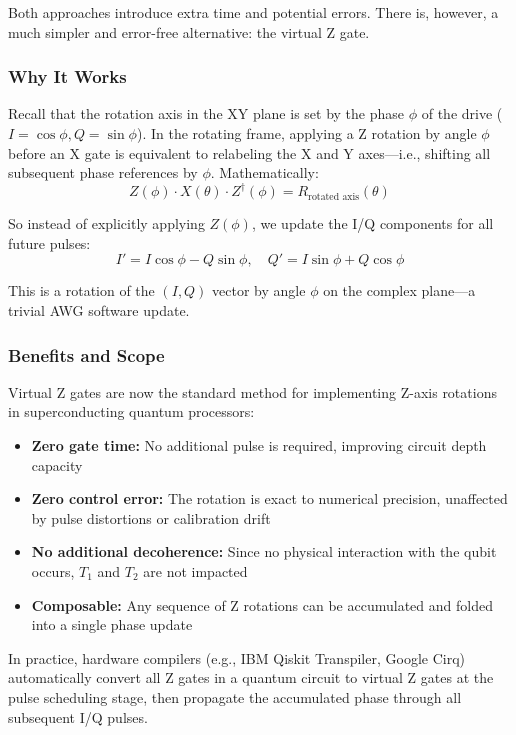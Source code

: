 \documentclass{article}
\begin{document}
Both approaches introduce extra time and potential errors. There is, however, a much simpler and error-free alternative: the virtual Z gate.

\subsubsection*{Why It Works}

Recall that the rotation axis in the XY plane is set by the phase $\phi$ of the drive ($I = \cos\phi, Q = \sin\phi$). In the rotating frame, applying a Z rotation by angle $\phi$ before an X gate is equivalent to relabeling the X and Y axes—i.e., shifting all subsequent phase references by $\phi$. Mathematically:
$$Z(\phi) \cdot X(\theta) \cdot Z^\dagger(\phi) = R_{\text{rotated axis}}(\theta)$$

So instead of explicitly applying $Z(\phi)$, we update the I/Q components for all future pulses:
$$I' = I \cos\phi - Q \sin\phi, \quad Q' = I \sin\phi + Q \cos\phi$$

This is a rotation of the $(I, Q)$ vector by angle $\phi$ on the complex plane—a trivial AWG software update.

\subsubsection*{Benefits and Scope}

Virtual Z gates are now the standard method for implementing Z-axis rotations in superconducting quantum processors:

\begin{itemize}
    \item \textbf{Zero gate time:} No additional pulse is required, improving circuit depth capacity
    \item \textbf{Zero control error:} The rotation is exact to numerical precision, unaffected by pulse distortions or calibration drift
    \item \textbf{No additional decoherence:} Since no physical interaction with the qubit occurs, $T_1$ and $T_2$ are not impacted
    \item \textbf{Composable:} Any sequence of Z rotations can be accumulated and folded into a single phase update
\end{itemize}

In practice, hardware compilers (e.g., IBM Qiskit Transpiler, Google Cirq) automatically convert all Z gates in a quantum circuit to virtual Z gates at the pulse scheduling stage, then propagate the accumulated phase through all subsequent I/Q pulses.
\end{document}
